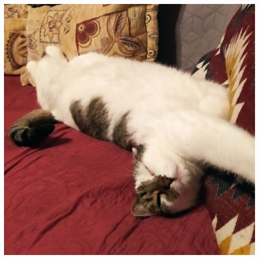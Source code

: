 \documentclass{article}
\begin{document}
\includegraphics[width=\textwidth]{./kytel.jpg}
\newpage


\newpage



\newpage


\newpage


\newpage


\newpage


\newpage

\listoftheorems
\end{document}
